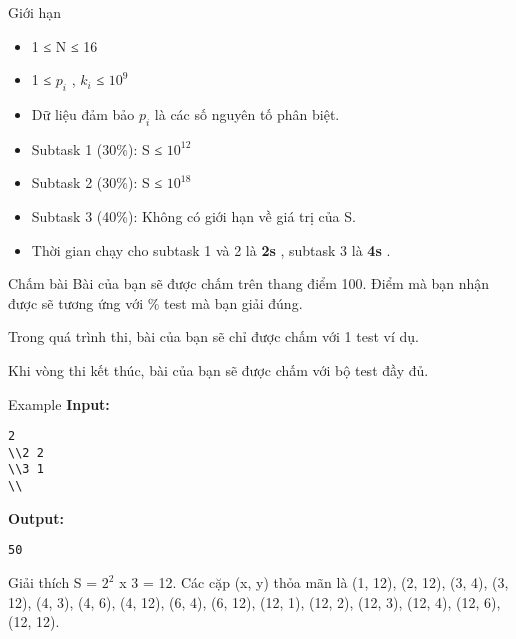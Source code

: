 Giới hạn  
\begin{itemize}
	\item     1 ≤ N ≤ 16   
	\item     1 ≤ $p_{i}$    , $k_{i}$    ≤ $10^{9}$
	\item     Dữ liệu đảm bảo $p_{i}$    là các số nguyên tố phân biệt.   
	\item     Subtask 1 (30\%): S ≤ $10^{12}$
	\item     Subtask 2 (30\%): S ≤ $10^{18}$
	\item     Subtask 3 (40\%): Không có giới hạn về giá trị của S.   
	\item     Thời gian chạy cho subtask 1 và 2 là    \textbf{     2s    }    , subtask 3 là    \textbf{     4s    }    .   
\end{itemize}
   Chấm bài  
Bài của bạn sẽ được chấm trên thang điểm 100. Điểm mà bạn nhận được sẽ tương ứng với \% test mà bạn giải đúng.  

   Trong quá trình thi, bài của bạn sẽ chỉ được chấm với 1 test ví dụ.  

   Khi vòng thi kết thúc, bài của bạn sẽ được chấm với bộ test đầy đủ.  
\begin{itemize}
\end{itemize}
\begin{itemize}
\end{itemize}
   Example  
\textbf{    Input:   }
\begin{verbatim}
2
\\2 2
\\3 1 
\\\end{verbatim}

\textbf{    Output:   }
\begin{verbatim}
50
\end{verbatim}
   Giải thích  
S = $2^{2}$   x 3 = 12. Các cặp (x, y) thỏa mãn là (1, 12), (2, 12), (3, 4), (3, 12), (4, 3), (4, 6), (4, 12), (6, 4), (6, 12), (12, 1), (12, 2), (12, 3), (12, 4), (12, 6), (12, 12).